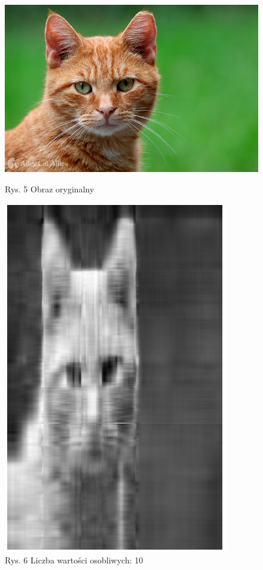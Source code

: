 \documentclass{article}
\begin{document}
        \begin{figure}[!htb]
          \begin{minipage}{0.48\textwidth}
            \centering
            \includegraphics[width=1\linewidth]{origin.jpeg}
            \caption*{Rys. 5 Obraz oryginalny}
          \end{minipage}\hfill
          \begin{minipage}{0.48\textwidth}
            \centering
            \includegraphics[width=.8\linewidth]{10.png}
            \caption*{Rys. 6 Liczba wartości osobliwych: 10}
          \end{minipage}
       \end{figure}
       
\end{document}
